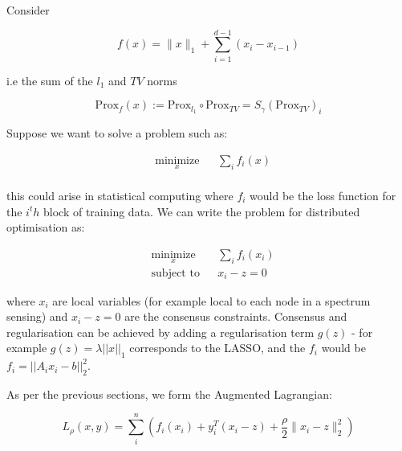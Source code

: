 \begin{example}
Consider

\begin{equation}
f(x) = \|x\|_1 + \sum_{i=1}^{d-1} \left( x_i - x_{i-1} \right) 
\end{equation}

i.e the sum of the \(l_1\) and \(TV\) norms

\begin{equation}
\mathrm{Prox}_f\left(x\right) := \mathrm{Prox}_{l_1} \circ \mathrm{Prox}_{TV} =  S_\gamma\left(\mathrm{Prox}_{TV}\right)_i 
\end{equation}
\end{example}

\begin{example}[Consensus]

Suppose we want to solve a problem such as:

\begin{equation*}
\begin{aligned}
& \underset{x}{\text{minimize}}
& & \sum_i f_i\left( x \right) \\
\label{consensus}
\end{aligned}
\end{equation*}

this could arise in statistical computing where \(f_i\) would be the loss function for the \(i^th\) block of training data. We can write the problem for distributed optimisation as:

\begin{equation*}
\begin{aligned}
& \underset{x}{\text{minimize}}
& & \sum_i f_i\left( x_i \right) \\
& \text{subject to}
& & x_i - z = 0
\label{admm_consensus}
\end{aligned}
\end{equation*}

where \(x_i\) are local variables (for example local to each node in a spectrum sensing) and \(x_i - z = 0\) are the consensus constraints. Consensus and regularisation can be achieved by adding a regularisation term \(g\left(z\right)\) - for example \(g\left(z\right) = \lambda||x||_1\) corresponds to the LASSO, and the \(f_i\) would be \(f_i = ||A_ix_i - b||_2^2\). 

As per the previous sections, we form the Augmented Lagrangian:

\begin{equation}
L_\rho\left(x,y\right) = \sum_i^n \left(f_i\left( x_i \right) + y_i^T\left(x_i-z\right) + \frac{\rho}{2}\|x_i-z\|_2^2\right)
\end{equation}


\end{example}
